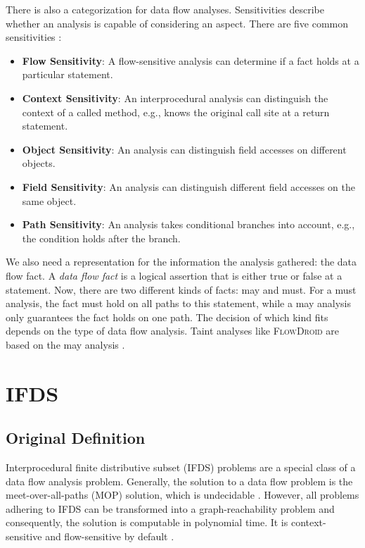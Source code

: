 \documentclass[../draft.tex]{subfiles}
\begin{document}
    There is also a categorization for data flow analyses. 
    Sensitivities describe whether an analysis is capable of considering an aspect. 
    There are five common sensitivities \cite{Khedker2009,Arzt2017PhD}:
    \begin{itemize}
        \item \textbf{Flow Sensitivity}: A flow-sensitive analysis can determine if a fact holds at a particular statement.
        \item \textbf{Context Sensitivity}: An interprocedural analysis can distinguish the context of a called method, e.g., knows the original call site at a return statement.
        \item \textbf{Object Sensitivity}: An analysis can distinguish field accesses on different objects.
        \item \textbf{Field Sensitivity}: An analysis can distinguish different field accesses on the same object.
        \item \textbf{Path Sensitivity}: An analysis takes conditional branches into account, e.g., the condition holds after the branch.
    \end{itemize}

    We also need a representation for the information the analysis gathered: the data flow fact. 
    A \textit{data flow fact} is a logical assertion that is either true or false at a statement. 
    Now, there are two different kinds of facts: may and must. 
    For a must analysis, the fact must hold on all paths to this statement, while a may analysis only guarantees the fact holds on one path. 
    The decision of which kind fits depends on the type of data flow analysis. 
    Taint analyses like \textsc{FlowDroid} are based on the may analysis \cite{Arzt2017PhD}.
    
    \section{IFDS}\label{s:bigifds}
    \subsection{Original Definition}\label{s:ifds}
    Interprocedural finite distributive subset (IFDS) problems are a special class of a data flow analysis problem. 
    Generally, the solution to a data flow problem is the meet-over-all-paths (MOP) solution, which is undecidable \cite{Rice1953}. 
    However, all problems adhering to IFDS can be transformed into a graph-reachability problem and consequently, the solution is computable in polynomial time. 
    It is context-sensitive and flow-sensitive by default \cite{Reps1995}.
\end{document}
